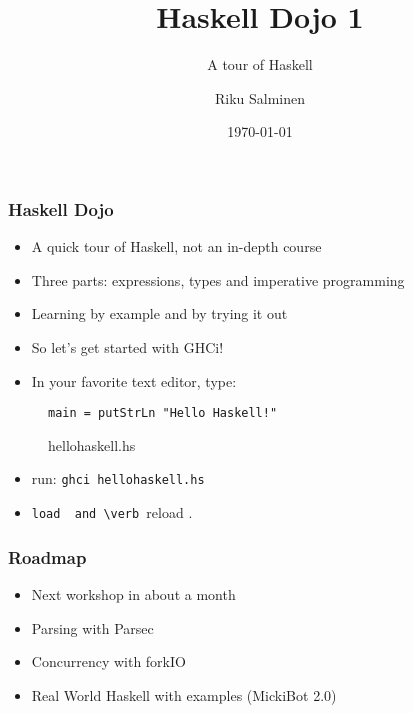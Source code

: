 \documentclass{beamer}
\title{Haskell Dojo 1}
\subtitle{A tour of Haskell}
\date{\today}
\author{Riku Salminen}
\begin{document}
\frame{\titlepage}

\begin{frame}[fragile]
\frametitle{Haskell Dojo}

\begin{itemize}
\item A quick tour of Haskell, not an in-depth course
\item Three parts: expressions, types and imperative programming
\item Learning by example and by trying it out
\item So let's get started with GHCi!
\item In your favorite text editor, type:
\end{itemize}

\begin{figure}[h!]
\caption{hellohaskell.hs}
\begin{verbatim}
main = putStrLn "Hello Haskell!"
\end{verbatim}
\end{figure}

\begin{itemize}
\item run: \verb+ghci hellohaskell.hs+
\item \verb :load  and \verb :reload .

\end{itemize}
\end{frame}

\begin{frame}[fragile]
\frametitle{Roadmap}

\begin{itemize}
\item Next workshop in about a month
\item Parsing with Parsec
\item Concurrency with forkIO
\item Real World Haskell with examples (MickiBot 2.0)
\end{itemize}
\end{frame}
\end{document}
